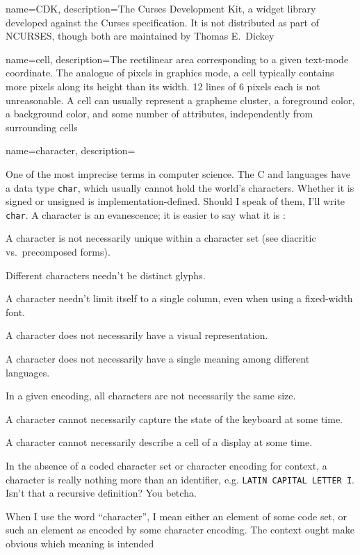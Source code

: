 {
  name={CDK},
description={The Curses Development Kit, a widget library developed against the
  Curses specification. It is not distributed as part of NCURSES, though
  both are maintained by Thomas E.\ Dickey}
}

{
  name={cell},
description={The rectilinear area corresponding to a given text-mode coordinate.
  The analogue of pixels in graphics mode, a cell typically contains more
  pixels along its height than its width. 12 lines of 6 pixels each is not
  unreasonable. A cell can usually represent a grapheme cluster, a foreground
  color, a background color, and some number of attributes, independently
  from surrounding cells}
}

{
  name={character},
description={One of the most imprecise terms in computer science. The C and \CC
  languages have a data type \texttt{char}, which usually cannot hold the
  world's characters. Whether it is signed or unsigned is implementation-defined.
  Should I speak of them, I'll write \texttt{char}. A character is an evanescence;
  it is easier to say what it is :
  \begin{denseitemize}
  \item{A character is not necessarily unique within a character set (see diacritic vs.\ precomposed forms).}
  \item{Different characters needn't be distinct glyphs\cite{nothinggoesaway}.}
  \item{A character needn't limit itself to a single column, even when using a fixed-width font.}
  \item{A character does not necessarily have a visual representation.}
  \item{A character does not necessarily have a single meaning among different languages.}
  \item{In a given encoding, all characters are not necessarily the same size.}
  \item{A character cannot necessarily capture the state of the keyboard at some time.}
  \item{A character cannot necessarily describe a cell of a display at some time.}
  \end{denseitemize}

  In the absence of a coded character set or character encoding for context, a
  character is really nothing more than an identifier, e.g. \texttt{LATIN
    CAPITAL LETTER I}. Isn't that a recursive definition? You betcha.

  When I use the word ``character'', I mean either an element of some code set, or
  such an element as encoded by some character encoding. The context ought make
  obvious which meaning is intended}
}

